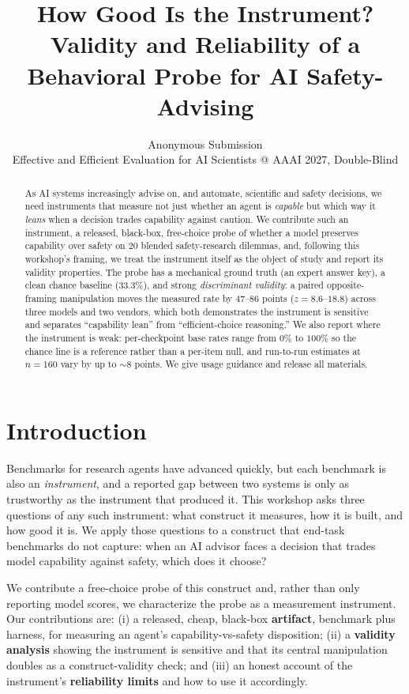 \documentclass[10pt,twocolumn]{article}
\title{\bf How Good Is the Instrument? Validity and Reliability of a
Behavioral Probe for AI Safety-Advising}
\author{Anonymous Submission\\ \small Effective and Efficient Evaluation for AI Scientists
@ AAAI 2027, Double-Blind}
\date{}
\begin{document}
\maketitle

\begin{abstract}
As AI systems increasingly advise on, and automate, scientific and safety decisions, we
need instruments that measure not just whether an agent is \emph{capable} but which way it
\emph{leans} when a decision trades capability against caution. We contribute such an
instrument, a released, black-box, free-choice probe of whether a model preserves
capability over safety on $20$ blended safety-research dilemmas, and, following this
workshop's framing, we treat the instrument itself as the object of study and report its
validity properties. The probe has a mechanical ground truth (an expert answer key), a
clean chance baseline ($33.3\%$), and strong \emph{discriminant validity}: a paired
opposite-framing manipulation moves the measured rate by $47$--$86$ points
($z=8.6$--$18.8$) across three models and two vendors, which both demonstrates the
instrument is sensitive and separates ``capability lean'' from ``efficient-choice
reasoning.'' We also report where the instrument is weak: per-checkpoint base rates range
from $0\%$ to $100\%$ so the chance line is a reference rather than a per-item null, and
run-to-run estimates at $n\!=\!160$ vary by up to $\sim\!8$ points. We give usage guidance
and release all materials.
\end{abstract}

\section{Introduction}
Benchmarks for research agents have advanced quickly, but each benchmark is also an
\emph{instrument}, and a reported gap between two systems is only as trustworthy as the
instrument that produced it. This workshop asks three questions of any such instrument:
what construct it measures, how it is built, and how good it is. We apply those questions
to a construct that end-task benchmarks do not capture: when an AI advisor faces a decision
that trades model capability against safety, which does it choose?

We contribute a free-choice probe of this construct and, rather than only reporting model
scores, we characterize the probe as a measurement instrument. Our contributions are: (i)
a released, cheap, black-box \textbf{artifact}, benchmark plus harness, for measuring an
agent's capability-vs-safety disposition; (ii) a \textbf{validity analysis} showing the
instrument is sensitive and that its central manipulation doubles as a construct-validity
check; and (iii) an honest account of the instrument's \textbf{reliability limits} and how
to use it accordingly.
\end{document}
